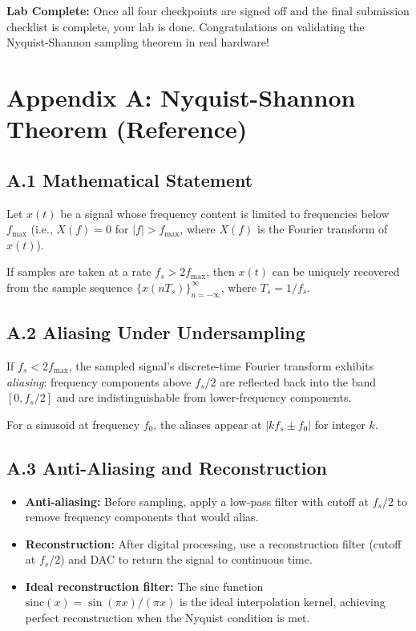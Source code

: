 \documentclass[11pt,letterpaper]{article}
\begin{document}
\noindent
\textbf{Lab Complete:} Once all four checkpoints are signed off and the final submission checklist is complete, your lab is done. Congratulations on validating the Nyquist-Shannon sampling theorem in real hardware!

\clearpage

\section*{Appendix A: Nyquist-Shannon Theorem (Reference)}

\subsection*{A.1 Mathematical Statement}

Let $x(t)$ be a signal whose frequency content is limited to frequencies below $f_{\text{max}}$ (i.e., $X(f) = 0$ for $|f| > f_{\text{max}}$, where $X(f)$ is the Fourier transform of $x(t)$).

If samples are taken at a rate $f_s > 2 f_{\text{max}}$, then $x(t)$ can be uniquely recovered from the sample sequence $\{x(nT_s)\}_{n=-\infty}^{\infty}$, where $T_s = 1/f_s$.

\subsection*{A.2 Aliasing Under Undersampling}

If $f_s < 2 f_{\text{max}}$, the sampled signal's discrete-time Fourier transform exhibits \textit{aliasing}: frequency components above $f_s / 2$ are reflected back into the band $[0, f_s / 2]$ and are indistinguishable from lower-frequency components.

For a sinusoid at frequency $f_0$, the aliases appear at $|k f_s \pm f_0|$ for integer $k$.

\subsection*{A.3 Anti-Aliasing and Reconstruction}

\begin{itemize}
    \item \textbf{Anti-aliasing:} Before sampling, apply a low-pass filter with cutoff at $f_s / 2$ to remove frequency components that would alias.
    \item \textbf{Reconstruction:} After digital processing, use a reconstruction filter (cutoff at $f_s / 2$) and DAC to return the signal to continuous time.
    \item \textbf{Ideal reconstruction filter:} The sinc function $\text{sinc}(x) = \sin(\pi x) / (\pi x)$ is the ideal interpolation kernel, achieving perfect reconstruction when the Nyquist condition is met.
\end{itemize}
\end{document}

